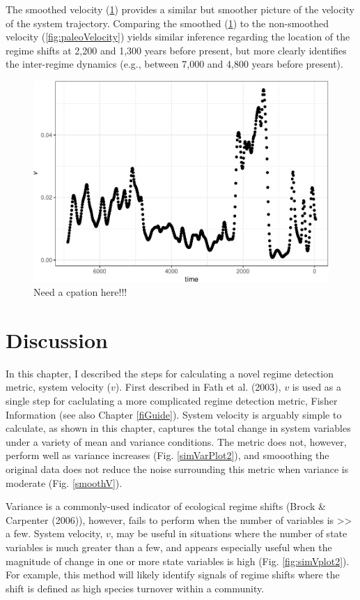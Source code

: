 \documentclass[12pt,twoside,openany]{reedthesis}
\begin{document}
The smoothed velocity (\ref{fig:paleoV}) provides a similar but smoother picture of the velocity of the system trajectory. Comparing the smoothed (\ref{fig:paleoV}) to the non-smoothed velocity (\ref{fig:paleoVelocity}) yields similar inference regarding the location of the regime shifts at 2,200 and 1,300 years before present, but more clearly identifies the inter-regime dynamics (e.g., between 7,000 and 4,800 years before present).
\begin{figure}
\centering
\includegraphics{_myDissertation_files/figure-latex/paleoV-1.pdf}
\caption{\label{fig:paleoV}Need a cpation here!!!}
\end{figure}
\hypertarget{discussion-2}{%
\section{Discussion}\label{discussion-2}}

In this chapter, I described the steps for calculating a novel regime detection metric, system velocity (\(v\)). First described in Fath et al. (2003), \(v\) is used as a single step for caclulating a more complicated regime detection metric, Fisher Information (see also Chapter \ref{fiGuide}). System velocity is arguably simple to calculate, as shown in this chapter, captures the total change in system variables under a variety of mean and variance conditions. The metric does not, however, perform well as variance increases (Fig. \ref{simVarPlot2}), and smooothing the original data does not reduce the noise surrounding this metric when variance is moderate (Fig. \ref{smoothV}).

Variance is a commonly-used indicator of ecological regime shifts (Brock \& Carpenter (2006)), however, fails to perform when the number of variables is \textgreater\textgreater{} a few. System velocity, \(v\), may be useful in situations where the number of state variables is much greater than a few, and appears especially useful when the magnitude of change in one or more state variables is high (Fig. \ref{fig:simVplot2}). For example, this method will likely identify signals of regime shifts where the shift is defined as high species turnover within a community.
\end{document}

